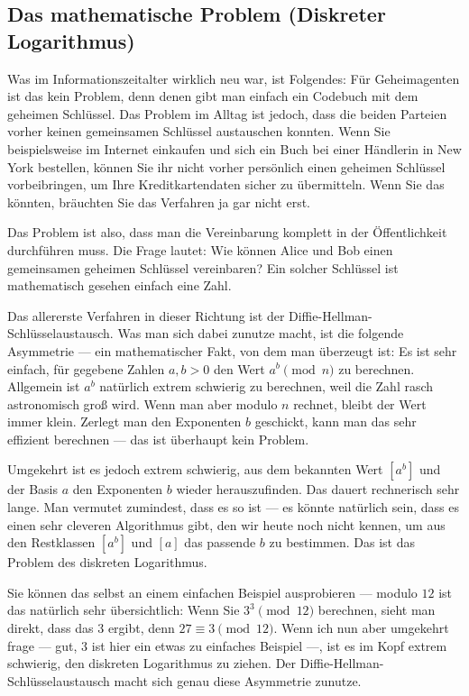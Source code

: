 \subsection{Das mathematische Problem (Diskreter Logarithmus)}

\begin{spoken-clean}[00:15:10 - 00:18:21]
Was im Informationszeitalter wirklich neu war, ist Folgendes: Für Geheimagenten ist das kein Problem, denn denen gibt man einfach ein Codebuch mit dem geheimen Schlüssel. Das Problem im Alltag ist jedoch, dass die beiden Parteien vorher keinen gemeinsamen Schlüssel austauschen konnten. Wenn Sie beispielsweise im Internet einkaufen und sich ein Buch bei einer Händlerin in New York bestellen, können Sie ihr nicht vorher persönlich einen geheimen Schlüssel vorbeibringen, um Ihre Kreditkartendaten sicher zu übermitteln. Wenn Sie das könnten, bräuchten Sie das Verfahren ja gar nicht erst.

Das Problem ist also, dass man die Vereinbarung komplett in der Öffentlichkeit durchführen muss. Die Frage lautet: Wie können Alice und Bob einen gemeinsamen geheimen Schlüssel vereinbaren? Ein solcher Schlüssel ist mathematisch gesehen einfach eine Zahl.

Das allererste Verfahren in dieser Richtung ist der Diffie-Hellman-\hspace{0pt}Schlüsselaustausch. Was man sich dabei zunutze macht, ist die folgende Asymmetrie --- ein mathematischer Fakt, von dem man überzeugt ist: Es ist sehr einfach, für gegebene Zahlen $a, b > 0$ den Wert $a^b \pmod n$ zu berechnen. Allgemein ist $a^b$ natürlich extrem schwierig zu berechnen, weil die Zahl rasch astronomisch groß wird. Wenn man aber modulo $n$ rechnet, bleibt der Wert immer klein. Zerlegt man den Exponenten $b$ geschickt, kann man das sehr effizient berechnen --- das ist überhaupt kein Problem.
\end{spoken-clean}

\begin{spoken-clean}[00:18:21 - 00:20:33]
Umgekehrt ist es jedoch extrem schwierig, aus dem bekannten Wert $[a^b]$ und der Basis $a$ den Exponenten $b$ wieder herauszufinden. Das dauert rechnerisch sehr lange. Man vermutet zumindest, dass es so ist --- es könnte natürlich sein, dass es einen sehr cleveren Algorithmus gibt, den wir heute noch nicht kennen, um aus den Restklassen $[a^b]$ und $[a]$ das passende $b$ zu bestimmen. Das ist das Problem des diskreten Logarithmus.

Sie können das selbst an einem einfachen Beispiel ausprobieren --- modulo $12$ ist das natürlich sehr übersichtlich: Wenn Sie $3^3 \pmod{12}$ berechnen, sieht man direkt, dass das $3$ ergibt, denn $27 \equiv 3 \pmod{12}$. Wenn ich nun aber umgekehrt frage --- gut, $3$ ist hier ein etwas zu einfaches Beispiel ---, ist es im Kopf extrem schwierig, den diskreten Logarithmus zu ziehen. Der Diffie-Hellman-Schlüsselaustausch macht sich genau diese Asymmetrie zunutze.
\end{spoken-clean}

